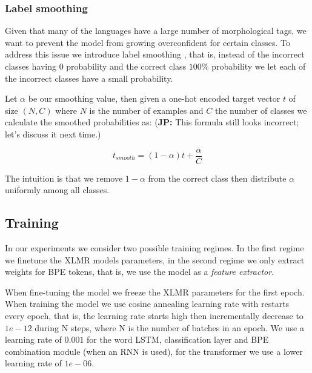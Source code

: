 \documentclass[11pt]{article}
\newcommand\jp[1]{(\textbf{JP:} #1)}
\begin{document}
	\subsubsection{Label smoothing}
    	Given that many of the languages have a large number of
     morphological tags, we want to prevent the model from growing
     overconfident for certain classes. To address this issue we
     introduce label smoothing \cite{szegedy2016rethinking}, that is,
     instead of the incorrect classes having 0 probability and the
     correct class $100\%$ probability we let each of the incorrect
     classes have a small probability.


                Let $\alpha$ be our smoothing value, then given a
     one-hot encoded target vector $t$ of size $(N,C)$ where $N$ is
     the number of examples and $C$ the number of classes we calculate
     the smoothed probabilities as:
     \jp{This formula still looks incorrect; let's discuss it next time.}

    \begin{equation}
        t_{smooth} = (1-\alpha)t + \frac{\alpha}{C}
    \end{equation}

            The intuition is that we remove $1-\alpha$ from the
     correct class then distribute $\alpha$ uniformly among all
     classes. 

     \subsection{Training}

	
         In our experiments we consider two possible training
     regimes. In the first regime we finetune the XLMR models
     parameters, in the second regime we only extract weights for BPE
     tokens, that is, we use the model as a \emph{feature extractor}.
     
            	When fine-tuning the model we freeze the XLMR
     parameters for the first epoch.  When training the model we use
     cosine annealing learning rate with restarts every epoch, that
     is, the learning rate starts high then incrementally decrease to
     $1e-12$ during N steps, where N is the number of batches in an
     epoch. We use a learning rate of $0.001$ for the word LSTM,
     classification layer and BPE combination module (when an RNN is
     used), for the transformer we use a lower learning rate of
     $1e-06$.
\end{document}
